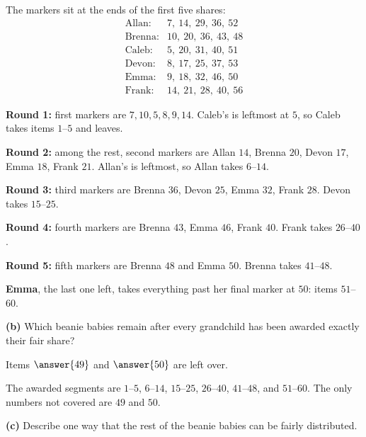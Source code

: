 \documentclass[12pt]{ximera}
\begin{document}
\begin{problem}
\begin{prompt}
\begin{feedback}
The markers sit at the ends of the first five shares:
\[
\begin{array}{ll}
\text{Allan}: & 7,\ 14,\ 29,\ 36,\ 52\\
\text{Brenna}: & 10,\ 20,\ 36,\ 43,\ 48\\
\text{Caleb}: & 5,\ 20,\ 31,\ 40,\ 51\\
\text{Devon}: & 8,\ 17,\ 25,\ 37,\ 53\\
\text{Emma}: & 9,\ 18,\ 32,\ 46,\ 50\\
\text{Frank}: & 14,\ 21,\ 28,\ 40,\ 56
\end{array}
\]

\textbf{Round 1:} first markers are $7, 10, 5, 8, 9, 14$. Caleb's is leftmost at $5$,
so Caleb takes items $1$--$5$ and leaves.

\textbf{Round 2:} among the rest, second markers are Allan $14$, Brenna $20$,
Devon $17$, Emma $18$, Frank $21$. Allan's is leftmost, so Allan takes $6$--$14$.

\textbf{Round 3:} third markers are Brenna $36$, Devon $25$, Emma $32$, Frank $28$.
Devon takes $15$--$25$.

\textbf{Round 4:} fourth markers are Brenna $43$, Emma $46$, Frank $40$. Frank takes
$26$--$40$.

\textbf{Round 5:} fifth markers are Brenna $48$ and Emma $50$. Brenna takes $41$--$48$.

\textbf{Emma}, the last one left, takes everything past her final marker at $50$:
items $51$--$60$.
\end{feedback}
\end{prompt}

\begin{prompt}
\textbf{(b)} Which beanie babies remain after every grandchild has been awarded exactly
their fair share?

Items $\answer{49}$ and $\answer{50}$ are left over.

\begin{feedback}
The awarded segments are $1$--$5$, $6$--$14$, $15$--$25$, $26$--$40$, $41$--$48$, and
$51$--$60$. The only numbers not covered are $49$ and $50$.
\end{feedback}
\end{prompt}

\begin{prompt}
\textbf{(c)} Describe one way that the rest of the beanie babies can be fairly
distributed.

\begin{freeResponse}
\end{freeResponse}


\end{prompt}
\end{problem}
\end{document}
